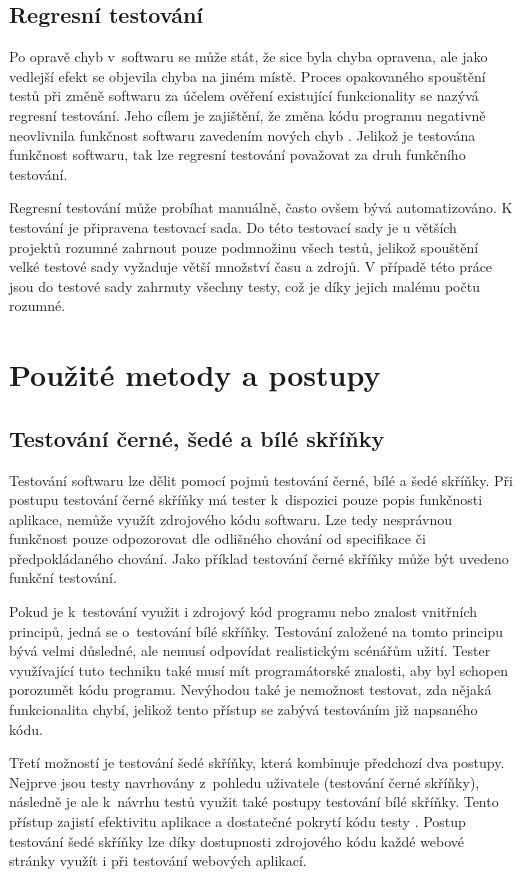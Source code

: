 \documentclass[
    color,   %
	table,   %
    twoside, %
]{fithesis3}
\begin{document}
\subsection{Regresní testování}
Po opravě chyb v~softwaru se může stát, že sice byla chyba opravena, ale jako vedlejší efekt se objevila chyba na jiném místě. Proces opakovaného spouštění testů při změně softwaru za účelem ověření existující funkcionality se nazývá regresní testování. Jeho cílem je zajištění, že změna kódu programu negativně neovlivnila funkčnost softwaru zavedením nových chyb \cite{Myers}. Jelikož je testována funkčnost softwaru, tak lze regresní testování považovat za druh funkčního testování. 

Regresní testování může probíhat manuálně, často ovšem bývá automatizováno. K testování je připravena testovací sada. Do této testovací sady je u větších projektů rozumné zahrnout pouze podmnožinu všech testů, jelikož spouštění velké testové sady vyžaduje větší množství času a zdrojů. V případě této práce jsou do testové sady zahrnuty všechny testy, což je díky jejich malému počtu rozumné.

\section{Použité metody a postupy}
\subsection{Testování černé, šedé a bílé skříňky}
Testování softwaru lze dělit pomocí pojmů testování černé, bílé a šedé skříňky. Při postupu testování černé skříňky má tester k~dispozici pouze popis funkčnosti aplikace, nemůže využít zdrojového kódu softwaru. Lze tedy nesprávnou funkčnost pouze odpozorovat dle odlišného chování od specifikace či předpokládaného chování. Jako příklad testování černé skříňky může být uvedeno funkční testování.

Pokud je k~testování využit i zdrojový kód programu nebo znalost vnitřních principů, jedná se o~testování bílé skříňky. Testování založené na tomto principu bývá velmi důsledné, ale nemusí odpovídat realistickým scénářům užití. Tester využívající tuto techniku také musí mít programátorské znalosti, aby byl schopen porozumět kódu programu. Nevýhodou také je nemožnost testovat, zda nějaká funkcionalita chybí, jelikož tento přístup se zabývá testováním již napsaného kódu.

Třetí možností je testování šedé skříňky, která kombinuje předchozí dva postupy. Nejprve jsou testy navrhovány z~pohledu uživatele (testování černé skříňky), následně je ale k~návrhu testů využit také postupy testování bílé skříňky. Tento přístup zajistí efektivitu aplikace a dostatečné pokrytí kódu testy \cite{Page}. Postup testování šedé skříňky lze díky dostupnosti zdrojového kódu každé webové stránky využít i při testování webových aplikací.
\end{document}
